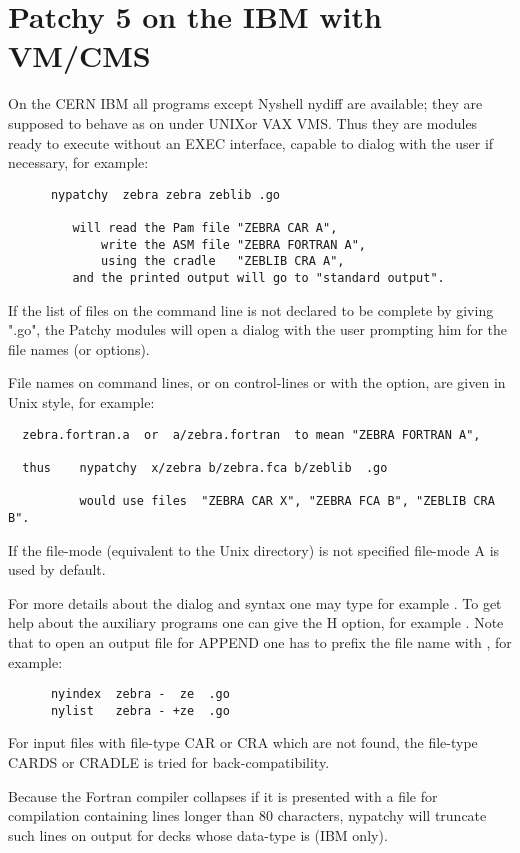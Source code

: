 \section{Patchy 5 on the IBM with VM/CMS}


On the CERN IBM all programs except Nyshell nydiff are available;
they are supposed to behave as on under UNIXor VAX VMS.
Thus they are modules ready to execute without an EXEC interface,
capable to dialog with the user if necessary, for example:
\begin{verbatim}
      nypatchy  zebra zebra zeblib .go

         will read the Pam file "ZEBRA CAR A",
             write the ASM file "ZEBRA FORTRAN A",
             using the cradle   "ZEBLIB CRA A",
         and the printed output will go to "standard output".
\end{verbatim}

If the list of files on the command line is not declared to be
complete by giving ".go", the Patchy modules will open a dialog
with the user prompting him for the file names (or options).


File names on command lines, or on control-lines  or  with
the  option, are given in Unix style, for example:
\begin{verbatim}
  zebra.fortran.a  or  a/zebra.fortran  to mean "ZEBRA FORTRAN A",

  thus    nypatchy  x/zebra b/zebra.fca b/zeblib  .go

          would use files  "ZEBRA CAR X", "ZEBRA FCA B", "ZEBLIB CRA B".
\end{verbatim}
If the file-mode (equivalent to the Unix directory) is not
specified file-mode A is used by default.

For more details about the dialog and syntax one may type
for example . To get help about the auxiliary
programs one can give the H option, for example .
Note that to open an output file for APPEND one has to prefix
the file name with \Lit{+}, for example:
\begin{verbatim}
      nyindex  zebra -  ze  .go
      nylist   zebra - +ze  .go
\end{verbatim}

For input files with file-type CAR or CRA which are not found,
the file-type CARDS or CRADLE is tried for back-compatibility.

Because the Fortran compiler collapses if it is presented with
a file for compilation containing lines longer than 80 characters,
nypatchy will truncate such lines on output for decks whose
data-type is  (IBM only).


